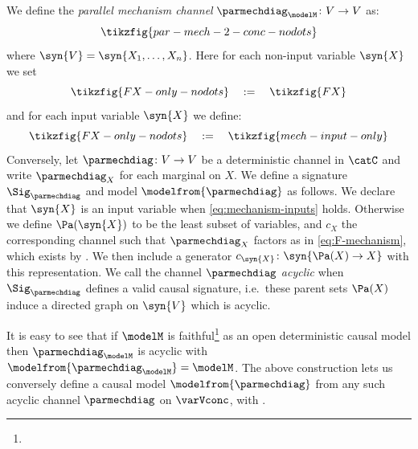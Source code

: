 \documentclass{article}
\begin{document}
\begin{definition}  
We define the \emph{parallel mechanism channel} $\parmechdiag_\modelM \colon V \to V$ as: 
\begin{equation} \label{eq:par-mech}
\tikzfig{par-mech-2-conc-nodots}
\end{equation}
where $\syn{V} = \syn{X_1,\dots,X_n}$. Here for each non-input variable $\syn{X}$ we set 
\begin{equation}
\tikzfig{FX-only-nodots} \ \ \ := \ \ \  
 \tikzfig{FX} \label{eq:F-mechanism}
\end{equation} 
and for each input variable $\syn{X}$ we define: 
\begin{equation} 
\tikzfig{FX-only-nodots} \ \ \ := \ \ \  \tikzfig{mech-input-only} \label{eq:mechanism-inputs}
\end{equation}
Conversely, let $\parmechdiag \colon V \to V$ be a deterministic channel in $\catC$ and write $\parmechdiag_X$ for each marginal on $X$. We define a signature $\Sig_\parmechdiag$ and model $\modelfrom{\parmechdiag}$ as follows. We declare that $\syn{X}$ is an input variable when \eqref{eq:mechanism-inputs} holds. Otherwise we define $\Pa(\syn{X})$ to be the least subset of variables, and $c_X$ the corresponding channel such that $\parmechdiag_X$ factors as in \eqref{eq:F-mechanism}, which exists by \cite[Lemma 112]{lorenz2023causal}. We then include a generator $c_\syn{X} \colon \syn{\Pa(X) \to X}$ with this representation. 
 We call the channel $\parmechdiag$ \emph{acyclic} when $\Sig_\parmechdiag$ defines a valid causal signature, i.e.~these parent sets $\Pa(X)$ induce a directed graph on $\syn{V}$ which is acyclic. 
\end{definition}

It is easy to see that if $\modelM$ is faithful\footnote{} as an open deterministic causal model then $\parmechdiag_\modelM$ is acyclic with $\modelfrom{\parmechdiag_\modelM} = \modelM$.  The above construction lets us conversely define a causal model $\modelfrom{\parmechdiag}$ from any such acyclic channel $\parmechdiag$ on $\varVconc$, with \rl{$\parmechdiag_{\modelfrom{\parmechdiag}} = \parmechdiag$}. 
\end{document}
